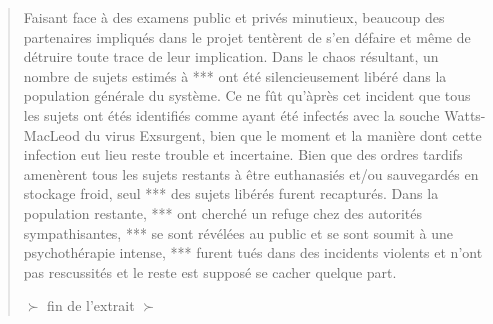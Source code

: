 \begin{quotation}
Faisant face à des examens public et privés minutieux, beaucoup des partenaires impliqués dans le projet tentèrent de s'en défaire  et même de détruire toute trace de leur implication. Dans le chaos résultant, un nombre de sujets estimés à *** ont été silencieusement libéré dans la population générale du système. Ce ne fût qu'àprès cet incident que tous les sujets ont étés identifiés comme ayant été infectés avec la souche Watts-MacLeod du virus Exsurgent, bien que le moment et la manière dont cette infection eut lieu reste trouble et incertaine. Bien que des ordres tardifs amenèrent tous les sujets restants à être euthanasiés et/ou sauvegardés en stockage froid, seul *** des sujets libérés furent recapturés. Dans la population restante, *** ont cherché un refuge chez des autorités sympathisantes, *** se sont révélées au public et se sont soumit à une psychothérapie intense, *** furent tués dans des incidents violents et n'ont pas rescussités et le reste est supposé se cacher quelque part. 

$\succ$ fin de l'extrait $\succ$ \end{quotation} 